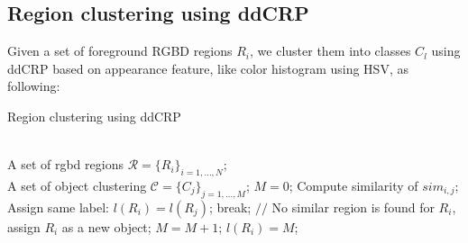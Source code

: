 
\subsection{Region clustering using ddCRP}

Given a set of foreground RGBD regions $R_i$, we cluster them into classes $C_l$ using ddCRP based on appearance feature, like color histogram using HSV, as following:
\begin{algorithm}[htb]
\caption{Region clustering using ddCRP}
\begin{algorithmic}[1]
\REQUIRE ~~\\
A set of rgbd regions $\mathcal{R}=\{R_i\}_{i=1,\ldots,N}$;
\ENSURE ~~\\
A set of object clustering $\mathcal{C}=\{C_j\}_{j=1,\ldots,M}$;
\STATE $M=0$;
\STATE Compute similarity of $sim_{i,j}$;
\STATE Assign same label: $l(R_i)=l(R_j)$;
\STATE break;
\ENDIF
\ENDFOR
\ENDFOR
{} 
\STATE $//$ No similar region is found for $R_i$, assign $R_i$ as a new object;
\STATE $M=M+1$;
\STATE $l(R_i)=M$;
\ENDIF
\end{algorithmic}
\end{algorithm}



